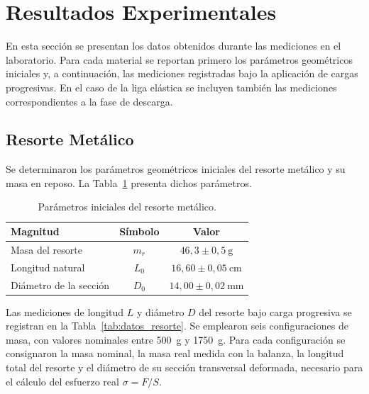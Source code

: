 
\section{Resultados Experimentales}
\label{sec:resultados}

En esta sección se presentan los datos obtenidos durante las mediciones
en el laboratorio. Para cada material se reportan primero los parámetros
geométricos iniciales y, a continuación, las mediciones registradas bajo
la aplicación de cargas progresivas. En el caso de la liga elástica se
incluyen también las mediciones correspondientes a la fase de descarga.

\subsection{Resorte Metálico}

Se determinaron los parámetros geométricos iniciales del resorte metálico
y su masa en reposo. La Tabla~\ref{tab:param_resorte} presenta dichos
parámetros.

\begin{table}[H]
    \centering
    \caption{Parámetros iniciales del resorte metálico.}
    \label{tab:param_resorte}
    \begin{tabular}{lcc}
        \toprule
        \textbf{Magnitud} & \textbf{Símbolo} & \textbf{Valor} \\
        \midrule
        Masa del resorte       & $m_r$ & $46{,}3  \pm 0{,}5\  \text{g}$  \\
        Longitud natural       & $L_0$ & $16{,}60 \pm 0{,}05\ \text{cm}$ \\
        Diámetro de la sección & $D_0$ & $14{,}00 \pm 0{,}02\ \text{mm}$ \\
        \bottomrule
    \end{tabular}
\end{table}

Las mediciones de longitud $L$ y diámetro $D$ del resorte bajo carga
progresiva se registran en la Tabla~\ref{tab:datos_resorte}. Se emplearon
seis configuraciones de masa, con valores nominales entre \qty{500}{g}
y \qty{1750}{g}. Para cada configuración se consignaron la masa nominal,
la masa real medida con la balanza, la longitud total del resorte y el
diámetro de su sección transversal deformada, necesario para el cálculo
del esfuerzo real $\sigma = F/S$.

